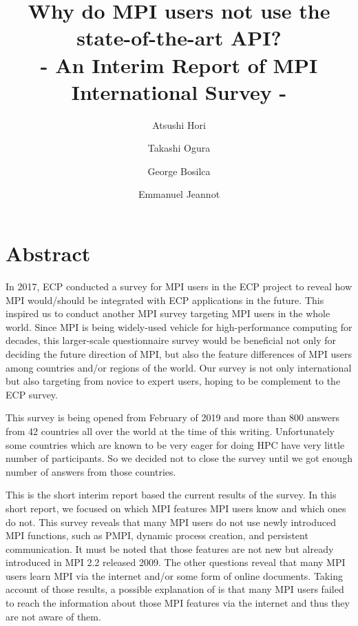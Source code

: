 \documentclass[sigconf,nonacm]{acmart}
\begin{document}
\title{Why do MPI users not use the state-of-the-art API?\\
- An Interim Report of MPI International Survey -}


\author{Atsushi Hori}
\author{Takashi Ogura}
 
\author{George Bosilca}
 
\author{Emmanuel Jeannot}

\maketitle

\section{Abstract}

In 2017, ECP\cite{ECP} conducted a survey for MPI users in the ECP
project to reveal how MPI would/should be integrated with ECP
applications in the future\cite{osti_1462877}.  
This inspired us to conduct another MPI survey targeting MPI users in the
whole world. Since MPI is being widely-used vehicle for
high-performance computing for decades, this larger-scale
questionnaire survey would be beneficial not only for deciding the
future direction of MPI, but also the feature differences of MPI users among
countries and/or regions of the world.  Our survey is not only
international but also targeting from novice to expert users, hoping
to be complement to the ECP survey.

This survey is being opened from February of 2019 and more than 800
answers from 42 countries all over the world at the time of this writing.
Unfortunately some countries which are known to be very eager for
doing HPC have very little number of participants. So we decided not
to close the survey until we got enough number of answers from those
countries. 

This is the short interim report based the current results
of the survey. 
In this short report, we focused on which MPI features MPI users
know and which ones do not. This survey reveals that many MPI
users do not use newly introduced MPI functions, such as PMPI, dynamic
process creation, and persistent communication. It must be noted that
those features are not new but already introduced in MPI 2.2
released 2009. The other questions 
reveal that many MPI users learn MPI  via the internet and/or some form of
online documents. Taking account of those results, a possible explanation of
is that many MPI users failed to reach the information about those
MPI features via the internet and thus they are not aware of them.
\end{document}

